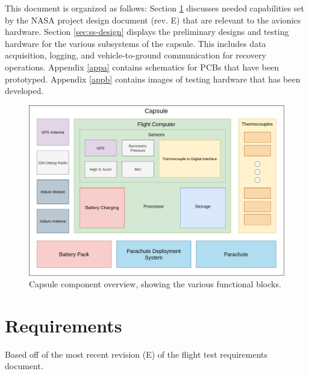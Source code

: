 \documentclass{article}
\newcommand{\ddrev}{E}
\begin{document}
This document is organized as follows: Section \ref{sec:requirements} discusses needed capabilities set by the NASA project design document (rev. \ddrev ) that are relevant to the avionics hardware. Section \ref{sec:ss-design} displays the preliminary designs and testing hardware for the various subsystems of the capsule. This includes data acquisition, logging, and vehicle-to-ground communication for recovery operations. Appendix \ref{appa} contains schematics for PCBs that have been prototyped. Appendix \ref{appb} contains images of testing hardware that has been developed. 

\begin{figure}[h!]
	\centering
	\includegraphics[width=\textwidth]{images/amtps-avionics.png}
	\caption{Capsule component overview, showing the various functional blocks.}
	\label{fig:capsule-overview}
\end{figure}


\section{Requirements}
\label{sec:requirements}
Based off of the most recent revision (\ddrev) of the flight test requirements document.
\end{document}

